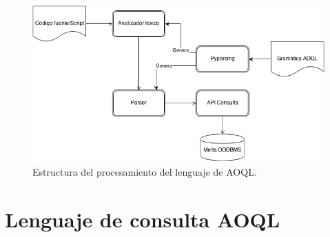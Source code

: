 \documentclass{melta}
\begin{document}
\begin{figure}
\centering
\includegraphics[scale=0.5]{MeltaAOQL}
\caption{Estructura del procesamiento del lenguaje de AOQL.}
\label{melta:aoql}
\end{figure}


\section{Lenguaje de consulta AOQL}
\label{sec:aoql}
\end{document}
